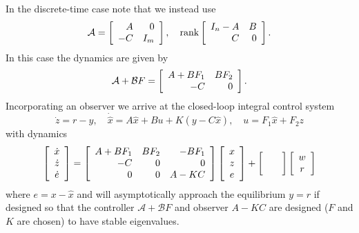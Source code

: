 \documentclass{report}
\begin{document}
In the discrete-time case note that we instead use
$$
\mathcal{A} =
\left[\begin{array}{r r}
 A & 0    \\
-C & I_m
\end{array}\right], \quad
\mathrm{rank}
\left[\begin{array}{r r}
I_n - A & B \\
    C   & 0
\end{array}\right].
$$
In this case the dynamics are given by
$$
\mathcal{A} + \mathcal{B} F =
\left[\begin{array}{r r}
  A + BF_1 & BF_2 \\
  -C       & 0
\end{array}\right].
$$
Incorporating an observer we arrive at the closed-loop integral
control system
$$
\dot{z} = r - y, \quad
\dot{\hat{x}} = A \hat{x} + B u + K (y - C \hat{x}), \quad
u = F_1 \hat{x} + F_2 z
$$
with dynamics
$$
\left[\begin{array}{c}
  \dot{x} \\
  \dot{z} \\
  \dot{e}
\end{array}\right] =
\left[\begin{array}{r r r}
  A + B F_1 & B F_2 & -B F_1 \\
  -C        & 0     &  0     \\
   0        & 0     &  A - K C
\end{array}\right]
\left[\begin{array}{c}
  x \\
  z \\
  e
\end{array}\right]
+
\left[\begin{array}{c}
  \quad \\
  \quad
\end{array}\right]
\left[\begin{array}{c}
  w \\
  r
\end{array}\right]
$$
where $e = x - \hat{x}$
and will asymptotically approach the equilibrium $y = r$ if designed
so that the controller $\mathcal{A} + \mathcal{B} F$ and
observer $A - K C$ are designed ($F$ and $K$ are chosen) to have
stable eigenvalues.
\end{document}
